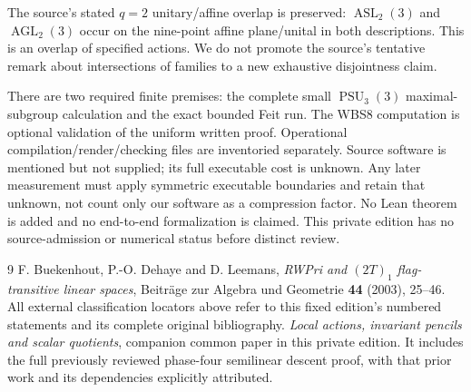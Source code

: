 \documentclass[11pt,a4paper]{article}
\begin{document}
The source's stated $q=2$ unitary/affine overlap is preserved:
$\operatorname{ASL}_2(3)$ and $\operatorname{AGL}_2(3)$ occur on the
nine-point affine plane/unital in both descriptions. This is an overlap
of specified actions. We do not promote the source's tentative remark
about intersections of families to a new exhaustive disjointness claim.

There are two required finite premises: the complete small
$\operatorname{PSU}_3(3)$ maximal-subgroup calculation and the exact
bounded Feit run. The WBS8 computation is optional validation of the
uniform written proof. Operational compilation/render/checking files
are inventoried separately. Source software is mentioned but not
supplied; its full executable cost is unknown. Any later measurement
must apply symmetric executable boundaries and retain that unknown,
not count only our software as a compression factor. No Lean theorem
is added and no end-to-end formalization is claimed. This private
edition has no source-admission or numerical status before distinct review.

\begin{thebibliography}{9}
 F. Buekenhout, P.-O. Dehaye and D. Leemans,
\emph{RWPri and $(2T)_1$ flag-transitive linear spaces},
Beitr\"age zur Algebra und Geometrie \textbf{44} (2003), 25--46.
All external classification locators above refer to this fixed edition's
numbered statements and its complete original bibliography.
 \emph{Local actions, invariant pencils and scalar quotients},
companion common paper in this private edition. It includes the full
previously reviewed phase-four semilinear descent proof, with that
prior work and its dependencies explicitly attributed.
\end{thebibliography}
\end{document}
